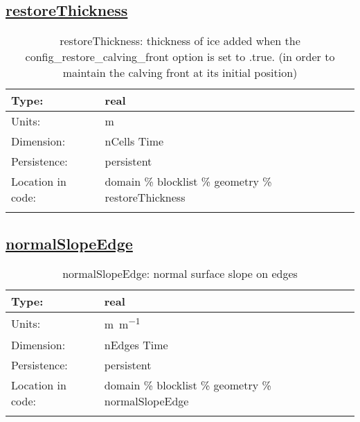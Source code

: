 \subsection[restoreThickness]{\hyperref[sec:var_tab_geometry]{restoreThickness}}
\label{subsec:var_sec_geometry_restoreThickness}
\begin{center}
\begin{longtable}{| p{2.0in} | p{4.0in} |}
        \hline 
        Type: & real \\
        \hline 
        Units: & \si{m} \\
        \hline 
        Dimension: & nCells Time \\
        \hline 
        Persistence: & persistent \\
        \hline 
         Location in code: & domain \% blocklist \% geometry \% restoreThickness \\
         \hline 
    \caption{restoreThickness: thickness of ice added when the config\_restore\_calving\_front option is set to .true. (in order to maintain the calving front at its initial position)}
\end{longtable}
\end{center}
\subsection[normalSlopeEdge]{\hyperref[sec:var_tab_geometry]{normalSlopeEdge}}
\label{subsec:var_sec_geometry_normalSlopeEdge}
\begin{center}
\begin{longtable}{| p{2.0in} | p{4.0in} |}
        \hline 
        Type: & real \\
        \hline 
        Units: & \si{m.m^{-1}} \\
        \hline 
        Dimension: & nEdges Time \\
        \hline 
        Persistence: & persistent \\
        \hline 
         Location in code: & domain \% blocklist \% geometry \% normalSlopeEdge \\
         \hline 
    \caption{normalSlopeEdge: normal surface slope on edges}
\end{longtable}
\end{center}

